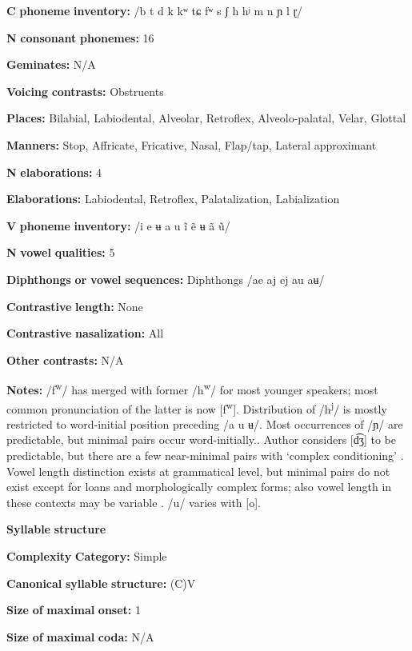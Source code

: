\textbf{C} \textbf{phoneme} \textbf{inventory:} /b t d k kʷ tɕ fʷ s ʃ h hʲ m n ɲ l ɽ/

\textbf{N} \textbf{consonant} \textbf{phonemes:} 16

\textbf{Geminates:} N/A

\textbf{Voicing} \textbf{contrasts:} Obstruents

\textbf{Places:} Bilabial, Labiodental, Alveolar, Retroflex, Alveolo-palatal, Velar, Glottal

\textbf{Manners:} Stop, Affricate, Fricative, Nasal, Flap/tap, Lateral approximant

\textbf{N} \textbf{elaborations:} 4

\textbf{Elaborations:} Labiodental, Retroflex, Palatalization, Labialization

\textbf{V} \textbf{phoneme} \textbf{inventory:} /i e ʉ a u ĩ ẽ ʉ ã ũ/

\textbf{N} \textbf{vowel} \textbf{qualities:} 5

\textbf{Diphthongs} \textbf{or} \textbf{vowel} \textbf{sequences:} Diphthongs /ae aj ej au aʉ/

\textbf{Contrastive} \textbf{length:} None

\textbf{Contrastive} \textbf{nasalization:} All

\textbf{Other} \textbf{contrasts:} N/A

\textbf{Notes:} /f\textsuperscript{w}/ has merged with former /h\textsuperscript{w}/ for most younger speakers; most common pronunciation of the latter is now [f\textsuperscript{w}]. Distribution of /h\textsuperscript{j}/ is mostly restricted to word-initial position preceding /a u ʉ/. Most occurrences of /ɲ/ are predictable, but minimal pairs occur word-initially.. Author considers [d͡ʒ] to be predictable, but there are a few near-minimal pairs with ‘complex conditioning’ \citep[30-49]{Olawsky2006}. Vowel length distinction exists at grammatical level, but minimal pairs do not exist except for loans and morphologically complex forms; also vowel length in these contexts may be variable \citep[56-7]{Olawsky2006}. /u/ varies with [o].

\textbf{Syllable} \textbf{structure}

\textbf{Complexity} \textbf{Category:} Simple

\textbf{Canonical} \textbf{syllable} \textbf{structure:} (C)V \citep[75-6]{Olawsky2006}

\textbf{Size} \textbf{of} \textbf{maximal} \textbf{onset:} 1

\textbf{Size} \textbf{of} \textbf{maximal} \textbf{coda:} N/A

